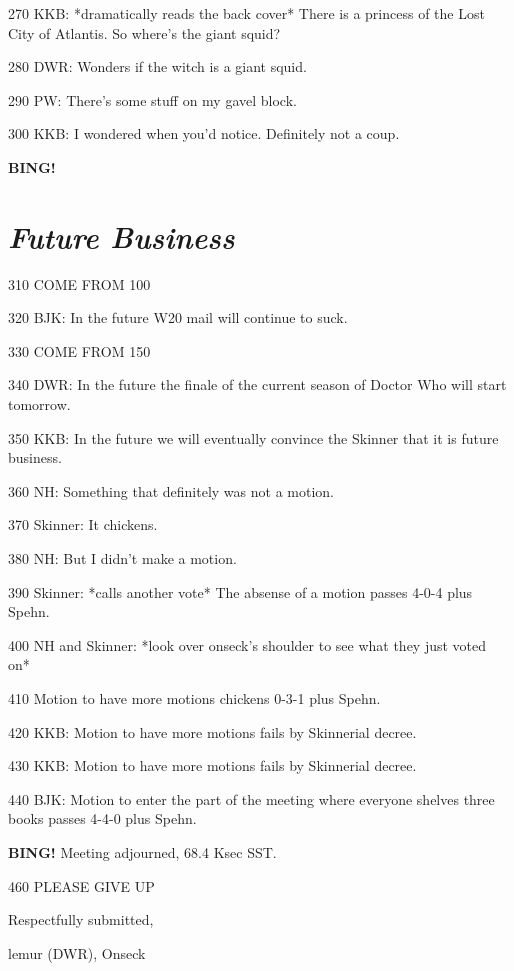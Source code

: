 \documentclass[10pt]{article}
\newcommand{\bing}{{\bf BING!} }
\newcommand{\goto}[1]{\bing \vskip 12pt \section*{{\em{#1}}}}
\newcommand{\ps}{ plus Spehn\xspace}
\newcommand{\onseck}{lemur (DWR), Onseck}
\begin{document}
270 KKB: *dramatically reads the back cover*  There is a princess of the Lost
City of Atlantis.  So where's the giant squid?

280 DWR: Wonders if the witch is a giant squid.

290 PW: There's some stuff on my gavel block.

300 KKB: I wondered when you'd notice.  Definitely not a coup.

\goto{Future Business}

310 COME FROM 100

320 BJK: In the future W20 mail will continue to suck.

330 COME FROM 150

340 DWR: In the future the finale of the current season of Doctor Who will start tomorrow.

350 KKB: In the future we will eventually convince the Skinner that it is
future business.

360 NH: Something that definitely was not a motion.

370 Skinner: It chickens.

380 NH: But I didn't make a motion.

390 Skinner: *calls another vote*  The absense of a motion passes 4-0-4\ps.

400 NH and Skinner: *look over onseck's shoulder to see what they just
voted on*

410 Motion to have more motions chickens 0-3-1\ps.

420 KKB: Motion to have more motions fails by Skinnerial decree. 

430 KKB: Motion to have more motions fails by Skinnerial decree.

440 BJK: Motion to enter the part of the meeting where everyone shelves
three books passes 4-4-0\ps.

\bing
{} Meeting adjourned, 68.4 Ksec SST.

460 PLEASE GIVE UP
\vspace{18pt}

\centerline{Respectfully submitted,}
\centerline{\onseck}
\end{document}
